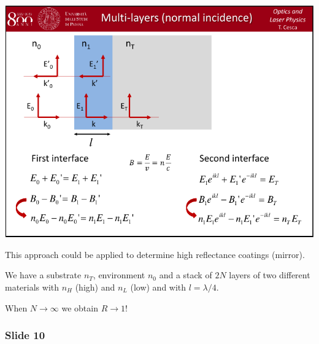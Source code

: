 \documentclass[../main/main.tex]{subfiles}
\begin{document}
\begin{minipage}[]{0.5\linewidth}
\centering
\includegraphics[page=9,width=1\textwidth]{../lessons/pdf_file/06_lecture.pdf}
\end{minipage}
\hspace{0.3cm}\vspace{0.3cm}
\begin{minipage}[c]{0.47\linewidth}

This approach could be applied to determine high reflectance coatings (mirror).

We have a substrate \( n_T \), environment \( n_0 \) and a stack of \( 2 N \) layers of two different materials with \( n_H \) (high) and \( n_L \) (low) and with \( l = \lambda /4 \).

When \( N \rightarrow \infty  \) we obtain \( R \rightarrow 1 \)!

\end{minipage}

\subsubsection*{Slide 10}
\end{document}
